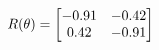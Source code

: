 \documentclass[preview]{standalone}
\begin{document}
\begin{align*}
\special{dvisvgm:raw <g id='unique000'>}R(\theta) = \begin{bmatrix}-0.91 & -0.42\\0.42 & -0.91\end{bmatrix}\special{dvisvgm:raw </g>}
\end{align*}
\end{document}
